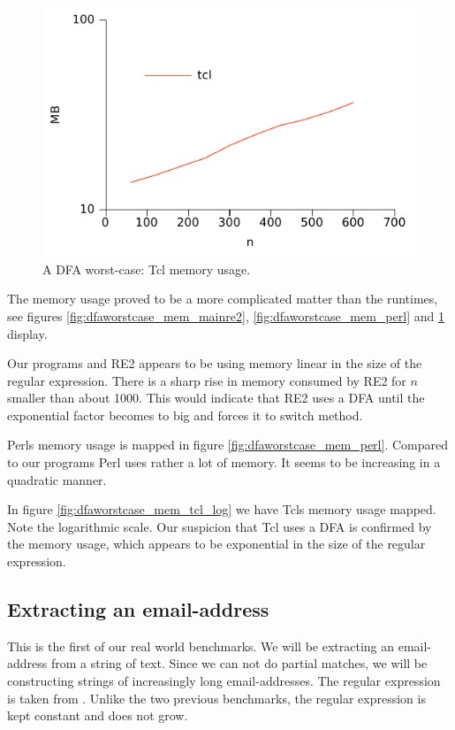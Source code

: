 \begin{figure}
\centering
\includegraphics{benchmarks/memory/dfaworstcase_tcl_log.pdf}
\caption{A DFA worst-case: Tcl memory usage.}
\label{fig:dfaworstcase_mem_tcl_log}
\end{figure}

The memory usage proved to be a more complicated matter than the
runtimes, see figures \ref{fig:dfaworstcase_mem_mainre2},
\ref{fig:dfaworstcase_mem_perl} and \ref{fig:dfaworstcase_mem_tcl_log}
display.

Our programs and RE2 appears to be using memory linear in the size of
the regular expression. There is a sharp rise in memory consumed by
RE2 for $n$ smaller than about 1000. This would indicate that RE2 uses
a DFA until the exponential factor becomes to big and forces it to
switch method. 

Perls memory usage is mapped in figure
\vref{fig:dfaworstcase_mem_perl}. Compared to our programs Perl uses
rather a lot of memory. It seems to be increasing in a quadratic
manner.%

In figure \vref{fig:dfaworstcase_mem_tcl_log} we have Tcls memory
usage mapped. Note the logarithmic scale. Our suspicion that Tcl uses
a DFA is confirmed by the memory usage, which appears to be
exponential in the size of the regular expression. 


\subsection{Extracting an email-address}

This is the first of our real world benchmarks. We will be extracting
an email-address from a string of text. Since we can not do partial
matches, we will be constructing strings of increasingly long
email-addresses. The regular expression is taken from
\cite{veanes}. Unlike the two previous benchmarks, the regular
expression is kept constant and does not grow.

